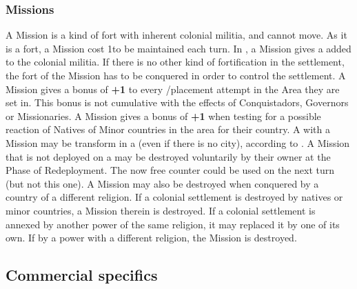 \subsubsection{Missions}
\aparag A Mission is a kind of fort with inherent colonial militia, and cannot
move. As it is a fort, a Mission cost 1\ducats to be maintained each turn.
\bparag In \COL, a Mission gives a \LDE added to the colonial militia.
\bparag If there is no other kind of fortification in the settlement, the fort
of the Mission has to be conquered in order to control the settlement.
\aparag A Mission gives a bonus of {\bf +1} to every \TP/\COL placement
attempt in the Area they are set in.
\bparag This bonus is not cumulative with the effects of Conquistadors,
Governors or Missionaries.
\aparag A Mission gives a bonus of {\bf +1} when testing for a possible
reaction of Natives of Minor countries in the area for their country.
\aparag A \TP with a Mission may be transform in a \COL (even if there is no
city), according to .
\aparag A Mission that is not deployed on a \COL may be destroyed voluntarily
by their owner at the Phase of Redeployment. The now free counter could be
used on the next turn (but not this one).
\bparag A Mission may also be destroyed when conquered by a country of a
different religion.
\bparag If a colonial settlement is destroyed by natives or minor countries, a
Mission therein is destroyed.
\bparag If a colonial settlement is annexed by another power of the same
religion, it may replaced it by one of its own. If by a power with a different
religion, the Mission is destroyed.



\subsection{Commercial specifics}

